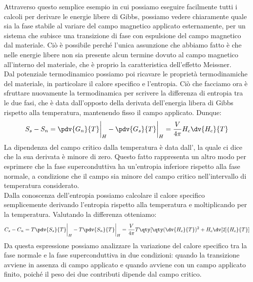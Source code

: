 Attraverso questo semplice esempio in cui possiamo eseguire facilmente tutti i calcoli per derivare le energie libere di Gibbs, possiamo vedere chiaramente quale sia la fase stabile al variare del campo magnetico applicato esternamente, per un sistema che subisce una transizione di fase con espulsione del campo magnetico dal materiale. Ciò è possibile perché l'unica assunzione che abbiamo fatto è che nelle energie libere non sia presente alcun termine dovuto al campo magnetico all'interno del materiale, che è proprio la caratteristica dell'effetto Meissner.\\
Dal potenziale termodinamico possiamo poi ricavare le proprietà termodinamiche del materiale, in particolare il calore specifico e l'entropia. Ciò che facciamo ora è sfruttare nuovamente la termodinamica per scrivere la differenza di entropia tra le due fasi, che è data dall'opposto della derivata dell'energia libera di Gibbs rispetto alla temperatura, mantenendo fisso il campo applicato. Dunque:
\begin{equation}
   S_s - S_n
   =\biggl. \pdv{G_n}{T} \biggr|_H - \biggl. \pdv{G_s}{T} \biggr|_H
   =\frac{V}{4\pi} H_c \dv{H_c}{T}
   \label{eq:differenza_entropie}
\end{equation}
La dipendenza del campo critico dalla temperatura è data dall', la quale ci dice che la sua derivata è minore di zero. Questo fatto rappresenta un altro modo per esprimere che la fase superconduttiva ha un'entropia inferiore rispetto alla fase normale, a condizione che il campo sia minore del campo critico nell'intervallo di temperatura considerato.\\
Dalla conoscenza dell'entropia possiamo calcolare il calore specifico semplicemente derivando l'entropia rispetto alla temperatura e moltiplicando per la temperatura. Valutando la differenza otteniamo:
\begin{equation*}
   C_s - C_n = T \biggl. \pdv{S_s}{T} \biggr|_H - \biggl. T \pdv{S_n}{T} \biggr|_H
   =\frac{V}{4\pi} T \qty[ \qty( \dv{H_c}{T} )^2 + H_c \dv[2]{H_c}{T} ]
\end{equation*}
Da questa espressione possiamo analizzare la variazione del calore specifico tra la fase normale e la fase superconduttiva in due condizioni: quando la transizione avviene in assenza di campo applicato e quando avviene con un campo applicato finito, poiché il peso dei due contributi dipende dal campo critico.\\
